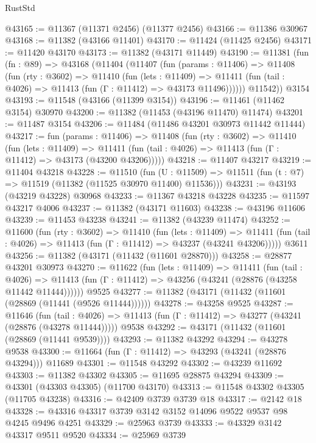\begin{lexlean}{RustStd}
\begin{coremodule}
@43165 := @11367 (@11371 @2456) (@11377 @2456)
@43166 := @11386 @30967
@43168 := @11382 (@43166 @11401)
@43170 := @11424 (@11425 @2456)
@43171 := @11420 @43170
@43173 := @11382 (@43171 @11449)
@43190 := @11381
    (fun (fn : @89) =>
    @43168
      (@11404
        (@11407
          (fun (params : @11406) =>
          @11408
            (fun (rty : @3602) =>
            @11410
              (fun (lets : @11409) =>
              @11411 (fun (tail : @4026) => @11413 (fun (Γ : @11412) => @43173 @11496))))))
        @11542))
    @3154
@43193 := @11548 (@43166 (@11399 @3154))
@43196 := @11461 (@11462 @3154) @30970
@43200 := @11382 (@11453 (@43196 @11470) @11474)
@43201 := @11487 @3154
@43206 := @11484 (@11486 @43201 @30973 @11442 @11444)
@43217 := fun (params : @11406) =>
  @11408
    (fun (rty : @3602) =>
    @11410
      (fun (lets : @11409) =>
      @11411 (fun (tail : @4026) => @11413 (fun (Γ : @11412) => @43173 (@43200 @43206)))))
@43218 := @11407 @43217
@43219 := @11404 @43218
@43228 := @11510
    (fun (U : @11509) => @11511 (fun (t : @7) => @11519 (@11382 (@11525 @30970 @11400) @11536)))
@43231 := @43193 (@43219 @43228) @30968
@43233 := @11367 @43218 @43228
@43235 := @11597 @43217 @4006
@43237 := @11382 (@43171 @11603)
@43238 := @43196 @11606
@43239 := @11453 @43238
@43241 := @11382 (@43239 @11474)
@43252 := @11600
    (fun (rty : @3602) =>
    @11410
      (fun (lets : @11409) =>
      @11411 (fun (tail : @4026) => @11413 (fun (Γ : @11412) => @43237 (@43241 @43206)))))
    @3611
@43256 := @11382 (@43171 (@11432 (@11601 @28870)))
@43258 := @28877 @43201 @30973
@43270 := @11622
    (fun (lets : @11409) =>
    @11411
      (fun (tail : @4026) =>
      @11413 (fun (Γ : @11412) => @43256 (@43241 (@28876 (@43258 @11442 @11444))))))
    @9525
@43277 := @11382 (@43171 (@11432 (@11601 (@28869 (@11441 (@9526 @11444))))))
@43278 := @43258 @9525
@43287 := @11646
    (fun (tail : @4026) => @11413 (fun (Γ : @11412) => @43277 (@43241 (@28876 (@43278 @11444)))))
    @9538
@43292 := @43171 (@11432 (@11601 (@28869 (@11441 @9539))))
@43293 := @11382 @43292
@43294 := @43278 @9538
@43300 := @11664 (fun (Γ : @11412) => @43293 (@43241 (@28876 @43294))) @11689
@43301 := @11548 @43292
@43302 := @43239 @11692
@43303 := @11382 @43302
@43305 := @11695 @28875 @43294
@43309 := @43301 (@43303 @43305) (@11700 @43170)
@43313 := @11548 @43302 @43305 (@11705 @43238)
@43316 := @42409 @3739 @3739 @18
@43317 := @2142 @18
@43328 := @43316 @43317 @3739 @3142 @3152 @14096 @9522 @9537 @98 @4245 @9496 @4251
@43329 := @25963 @3739
@43333 := @43329 @3142 @43317 @9511 @9520
@43334 := @25969 @3739

\end{coremodule}
\end{lexlean}
